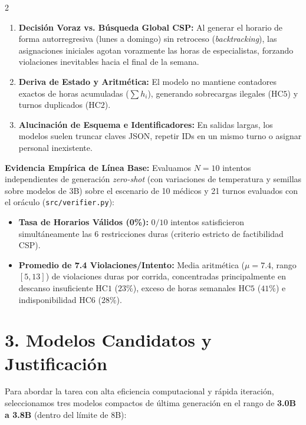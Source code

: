 \documentclass[9.5pt,a4paper]{extarticle}
\begin{document}
\begin{multicols}{2}
\begin{enumerate}[label=\textbf{\arabic*.}]
    \item \textbf{Decisión Voraz vs. Búsqueda Global CSP:}
    Al generar el horario de forma autorregresiva (lunes a domingo) sin retroceso (\textit{backtracking}), las asignaciones iniciales agotan vorazmente las horas de especialistas, forzando violaciones inevitables hacia el final de la semana.
    \item \textbf{Deriva de Estado y Aritmética:}
    El modelo no mantiene contadores exactos de horas acumuladas ($\sum h_i$), generando sobrecargas ilegales ($\text{HC5}$) y turnos duplicados ($\text{HC2}$).
    \item \textbf{Alucinación de Esquema e Identificadores:}
    En salidas largas, los modelos suelen truncar claves JSON, repetir IDs en un mismo turno o asignar personal inexistente.
\end{enumerate}

\textbf{Evidencia Empírica de Línea Base:} Evaluamos $N = 10$ intentos independientes de generación \textit{zero-shot} (con variaciones de temperatura y semillas sobre modelos de 3B) sobre el escenario de 10 médicos y 21 turnos evaluados con el oráculo (\texttt{src/verifier.py}):
\begin{itemize}[label=$\blacktriangleright$]
    \item \textbf{Tasa de Horarios Válidos (0\%):} $0/10$ intentos satisficieron simultáneamente las 6 restricciones duras (criterio estricto de factibilidad CSP).
    \item \textbf{Promedio de 7.4 Violaciones/Intento:} Media aritmética ($\mu = 7.4$, rango $[5, 13]$) de violaciones duras por corrida, concentradas principalmente en descanso insuficiente $\text{HC1}$ ($23\%$), exceso de horas semanales $\text{HC5}$ ($41\%$) e indisponibilidad $\text{HC6}$ ($28\%$).
\end{itemize}

\section{3. Modelos Candidatos y Justificación}
Para abordar la tarea con alta eficiencia computacional y rápida iteración, seleccionamos tres modelos compactos de última generación en el rango de \textbf{3.0B a 3.8B} (dentro del límite de 8B):


\end{multicols}
\end{document}
